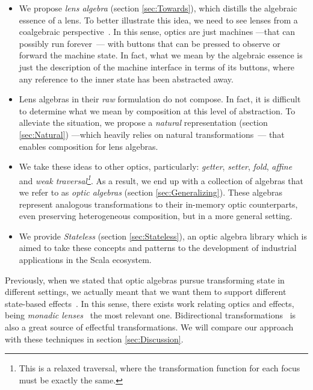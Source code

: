 \documentclass[preview, 3p]{elsarticle}
\begin{document}
\begin{itemize}

\item We propose \emph{lens algebra} (section \ref{sec:Towards}), which distills
the algebraic essence of a lens. To better illustrate this idea, we need to see
lenses from a coalgebraic perspective~\cite{jacobs1995objects,
jacobs1997tutorial, oconnor2011functor}. In this sense, optics are just machines
---that can possibly run forever~\cite{turner2004total}--- with buttons that can
be pressed to observe or forward the machine state. In fact, what we mean by the
algebraic essence is just the description of the machine interface in terms of
its buttons, where any reference to the inner state has been abstracted away.

\item Lens algebras in their \emph{raw} formulation do not compose. In fact, it
is difficult to determine what we mean by composition at this level of
abstraction. To alleviate the situation, we propose a \emph{natural}
representation (section \ref{sec:Natural}) ---which heavily relies on natural
transformations~\cite{pierce1991basic}--- that enables composition for lens
algebras.

\item We take these ideas to other optics, particularly: \emph{getter},
\emph{setter}, \emph{fold}, \emph{affine} and \emph{weak traversal\footnote{This
is a relaxed traversal, where the transformation function for each focus must be
exactly the same.}}. As a result, we end up with a collection of algebras that
we refer to as \emph{optic algebras} (section \ref{sec:Generalizing}). These
algebras represent analogous transformations to their in-memory optic
counterparts, even preserving heterogeneous composition, but in a more general
setting.

\item We provide \emph{Stateless} (section \ref{sec:Stateless}), an optic
algebra library which is aimed to take these concepts and patterns to the
development of industrial applications in the Scala ecosystem.

\end{itemize}

Previously, when we stated that optic algebras pursue transforming state in
different settings, we actually meant that we want them to support different
state-based effects~\cite{wadler1995monads}. In this sense, there exists work
relating optics and effects, being \emph{monadic
lenses}~\cite{abou2016reflections} the most relevant one. Bidirectional
transformations~\cite{abou2015notions, abou2017coalgebraic} is also a great
source of effectful transformations. We will compare our approach with these
techniques in section \ref{sec:Discussion}.
\end{document}
